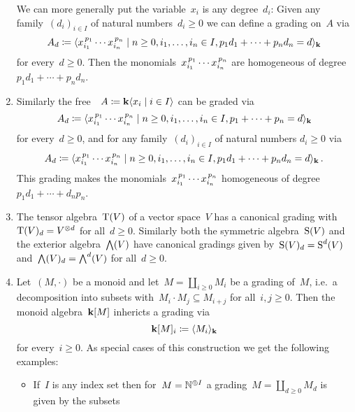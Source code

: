 \begin{examples}
\begin{enumerate}
      We can more generally put the variable~$x_i$ is any degree~$d_i$:
      Given any family~$(d_i)_{i \in I}$ of natural numbers~$d_i \geq 0$ we can define a grading on~$A$ via
      \[
        A_d
        \defined
        \gen{
          x_{i_1}^{\spacing p_1} \dotsm x_{i_n}^{\spacing p_n}
        \suchthat
          n \geq 0,
          i_1, \dotsc, i_n \in I,
          p_1 d_1 + \dotsb + p_n d_n = d
        }_\kf
      \]
      for every~$d \geq 0$.
      Then the monomials~$x_{i_1}^{\, p_1} \dotsm x_{i_n}^{\, p_n}$ are homogeneous of degree~$p_1 d_1 + \dotsb + p_n d_n$.
    \item
      Similarly the free~{\algebra{$\kf$}}~$A \defined \kf\gen{x_i \suchthat i \in I}$ can be graded via
      \[
        A_d
        \defined
        \gen{
          x_{i_1}^{\spacing p_1} \dotsm x_{i_n}^{\spacing p_n}
        \suchthat
          n \geq 0,
          i_1, \dotsc, i_n \in I,
          p_1 + \dotsb + p_n = d
        }_{\kf}
      \]
      for every~$d \geq 0$, and for any family~$(d_i)_{i \in I}$ of natural numbers $d_i \geq 0$ via
      \[
        A_d
        \defined
        \gen{
          x_{i_1}^{\spacing p_1} \dotsm x_{i_n}^{\spacing p_n}
        \suchthat
          n \geq 0,
          i_1, \dotsc, i_n \in I,
          p_1 d_1 + \dotsb + p_n d_n = d
        }_{\kf} \,.
      \]
      This grading makes the monomials~$x_{i_1}^{\, p_1} \dotsm x_{i_n}^{\, p_n}$ homogeneous of degree~$p_1 d_1 + \dotsb + d_n p_n$.
    \item
      The tensor algebra~$\operatorname{T}(V)$ of a vector space~$V$ has a canonical grading with~$\operatorname{T}(V)_d = V^{\otimes d}$ for all~$d \geq 0$.
      Similarly both the symmetric algebra~$\operatorname{S}(V)$ and the exterior algebra~$\bigwedge(V)$ have canonical gradings given by~$\operatorname{S}(V)_d = \operatorname{S}^d(V)$ and~$\bigwedge(V)_d = \bigwedge^d(V)$ for all~$d \geq 0$.
    \item
      Let~$(M, \cdot)$ be a monoid and let~$M = \coprod_{i \geq 0} M_i$ be a grading of~$M$, i.e.\ a decomposition into subsets with~$M_i \cdot M_j \subseteq M_{i+j}$ for all~$i, j \geq 0$.
      Then the monoid algebra~$\mathbf{k}[M]$ inhericts a grading via
      \[
        \mathbf{k}[M]_i
        \coloneqq
        \langle M_i \rangle_{\mathbf{k}}
      \]
      for every~$i \geq 0$.
      As special cases of this construction we get the following examples:
      \begin{itemize}
        \item
          If~$I$ is any index set then for~$M = \mathbb{N}^{\oplus I}$ a grading~$M = \coprod_{d \geq 0} M_d$ is given by the subsets

\end{itemize}
\end{enumerate}
\end{examples}
